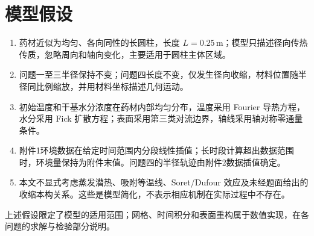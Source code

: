 \section{模型假设}

\begin{enumerate}
\item 药材近似为均匀、各向同性的长圆柱，长度 $L=0.25\,\mathrm{m}$；模型只描述径向传热传质，忽略周向和轴向变化，主要适用于圆柱主体区域。
\item 问题一至三半径保持不变；问题四长度不变，仅发生径向收缩，材料位置随半径同比例缩放，并用材料坐标描述几何运动。
\item 初始温度和干基水分浓度在药材内部均匀分布，温度采用 Fourier 导热方程，水分采用 Fick 扩散方程；表面采用第三类对流边界，轴线采用轴对称零通量条件。
\item 附件1环境数据在给定时间范围内分段线性插值；长时段计算超出数据范围时，环境量保持为附件末值。问题四的半径轨迹由附件2数据插值确定。
\item 本文不显式考虑蒸发潜热、吸附等温线、Soret/Dufour 效应及未经题面给出的收缩本构关系。这些是模型简化，不表示相应机制在实际过程中不存在。
\end{enumerate}

上述假设限定了模型的适用范围；网格、时间积分和表面重构属于数值实现，在各问题的求解与检验部分说明。
